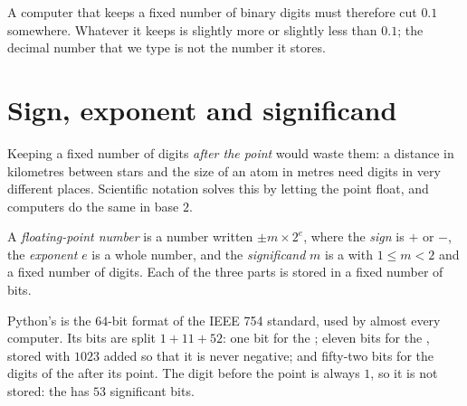 \label{lst:g10:floating-point:to-binary-fraction}

\label{out:g10:floating-point:to-binary-fraction}

A computer that keeps a fixed number of binary digits must therefore cut $0.1$ somewhere. Whatever it keeps is
slightly more or slightly less than $0.1$; the decimal number that we type is not the number it stores.

\section{Sign, exponent and significand}\label{sec:g10:floating-point:format}

Keeping a fixed number of digits \emph{after the point} would waste them: a distance in kilometres between stars
and the size of an atom in metres need digits in very different places. Scientific notation solves this by letting
the point float, and computers do the same in base $2$.

\begin{definition}\label{def:g10:floating-point:float}
A \emph{floating-point number} is a number written $\pm m \times 2^{e}$, where the
\emph{sign} is $+$ or $-$, the \emph{exponent} $e$ is a
whole number, and the \emph{significand} $m$ is a  with $1 \le m < 2$ and a fixed
number of digits. Each of the three parts is stored in a fixed number of bits.
\end{definition}

Python's  is the $64$-bit format of the IEEE 754 standard, used by almost every computer. Its bits are
split $1 + 11 + 52$: one bit for the ; eleven bits for the , stored with $1023$ added so that it is never
negative; and fifty-two bits for the digits of the  after its point. The digit before the point is always
$1$, so it is not stored: the  has $53$ significant bits.

